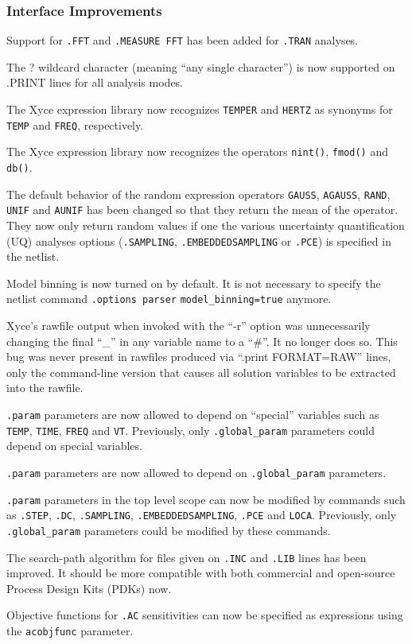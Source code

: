 \documentclass[letterpaper]{scrartcl}
\begin{document}
\subsubsection*{Interface Improvements}
\begin{XyceItemize}
  \item Support for \texttt{.FFT} and \texttt{.MEASURE FFT} has been
    added for \texttt{.TRAN} analyses.
  \item The ? wildcard character (meaning ``any single character'') is
    now supported on .PRINT lines for all analysis modes.
  \item The Xyce expression library now recognizes \texttt{TEMPER} and
    \texttt{HERTZ} as synonyms for \texttt{TEMP} and \texttt{FREQ},
    respectively.
  \item The Xyce expression library now recognizes the operators
    \texttt{nint()}, \texttt{fmod()} and \texttt{db()}.
  \item The default behavior of the random expression operators
    \texttt{GAUSS}, \texttt{AGAUSS}, \texttt{RAND}, \texttt{UNIF} and
    \texttt{AUNIF} has been changed so that they return the mean of
    the operator.  They now only return random values if one the
    various uncertainty quantification (UQ) analyses options
    (\texttt{.SAMPLING}, \texttt{.EMBEDDEDSAMPLING} or \texttt{.PCE})
    is specified in the netlist.
  \item Model binning is now turned on by default.  It is not
    necessary to specify the netlist command \texttt{.options parser}
    \texttt{model\_binning=true} anymore.
  \item Xyce's rawfile output when invoked with the ``-r'' option was
    unnecessarily changing the final ``\_'' in any variable name to a
    ``\#''.  It no longer does so.  This bug was never present in
    rawfiles produced via ``.print FORMAT=RAW'' lines, only the
    command-line version that causes all solution variables to be
    extracted into the rawfile.
  \item \texttt{.param} parameters are now allowed to depend on
    ``special'' variables such as \texttt{TEMP}, \texttt{TIME},
    \texttt{FREQ} and \texttt{VT}.  Previously, only
    \texttt{.global\_param} parameters could depend on special
    variables.
  \item \texttt{.param} parameters are now allowed to depend on
    \texttt{.global\_param} parameters.
  \item \texttt{.param} parameters in the top level scope can now be
    modified by commands such as \texttt{.STEP}, \texttt{.DC},
    \texttt{.SAMPLING}, \texttt{.EMBEDDEDSAMPLING}, \texttt{.PCE} and
    \texttt{LOCA}.  Previously, only \texttt{.global\_param}
    parameters could be modified by these commands.
  \item The search-path algorithm for files given on \texttt{.INC} and
    \texttt{.LIB} lines has been improved.  It should be more
    compatible with both commercial and open-source Process Design
    Kits (PDKs) now.
  \item Objective functions for \texttt{.AC} sensitivities can now be
    specified as expressions using the \texttt{acobjfunc} parameter.
\end{XyceItemize}
\end{document}
